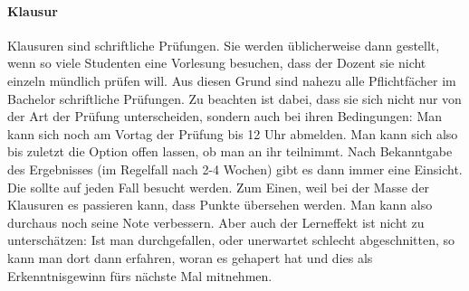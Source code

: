\begin{multicols}{2}
	\paragraph*{Klausur}
	Klausuren sind schriftliche Prüfungen. Sie werden üblicherweise dann gestellt, wenn so viele Studenten eine Vorlesung besuchen, dass der Dozent sie nicht einzeln mündlich prüfen will. Aus diesen Grund sind nahezu alle Pflichtfächer im Bachelor schriftliche Prüfungen. Zu beachten ist dabei, dass sie sich nicht nur von der Art der Prüfung unterscheiden, sondern auch bei ihren Bedingungen: Man kann sich noch am Vortag der Prüfung bis 12 Uhr abmelden. Man kann sich also bis zuletzt die Option offen lassen, ob man an ihr teilnimmt. Nach Bekanntgabe des Ergebnisses (im Regelfall nach 2-4 Wochen) gibt es dann immer eine Einsicht. Die sollte auf jeden Fall besucht werden. Zum Einen, weil bei der Masse der Klausuren es passieren kann, dass Punkte übersehen werden. Man kann also durchaus noch seine Note verbessern. Aber auch der Lerneffekt ist nicht zu unterschätzen: Ist man durchgefallen, oder unerwartet schlecht abgeschnitten, so kann man dort dann erfahren, woran es gehapert hat und dies als Erkenntnisgewinn fürs nächste Mal mitnehmen.


\end{multicols}
